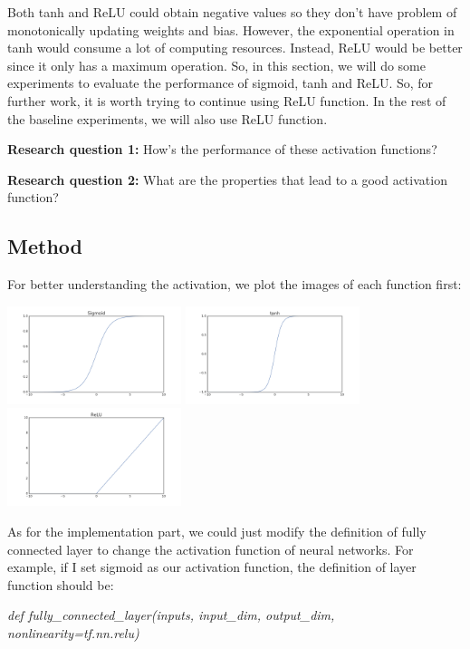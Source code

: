 \documentclass[]{article}
\begin{document}
Both tanh and ReLU could obtain negative values so they don't have problem of monotonically updating weights and bias. However, the exponential operation in tanh would consume a lot of computing resources. Instead, ReLU would be better since it only has a maximum operation. So, in this section, we will do some experiments to evaluate the performance of sigmoid, tanh and ReLU. So, for further work, it is worth trying to continue using ReLU function. In the rest of the baseline experiments, we will also use ReLU function.

\textbf{Research question 1:} How's the performance of these activation functions?

\textbf{Research question 2:} What are the properties that lead to a good activation function?

\subsection{Method}
For better understanding the activation, we plot the images of each function first:

\includegraphics[width=2in]{Sigmoid}
\includegraphics[width=2in]{tanh}
\includegraphics[width=2in]{ReLU}

As for the implementation part, we could just modify the definition of fully connected layer to change the activation function of neural networks. For example, if I set sigmoid as our activation function, the definition of layer function should be:

\emph{def fully\_connected\_layer(inputs, input\_dim, output\_dim, nonlinearity=tf.nn.relu)}
\end{document}
